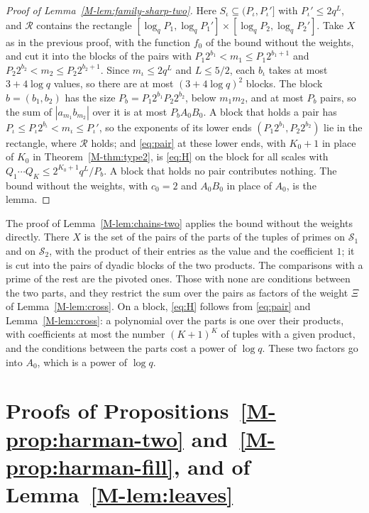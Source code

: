 \documentclass[11pt]{article}
\numberwithin{equation}{section}
\begin{document}
\begin{proof}[Proof of Lemma~\ref{M-lem:family-sharp-two}]
Here $S_\iota \subseteq (P_\iota, P_\iota']$ with $P_\iota' \le 2q^L$, and $\mathcal R$ contains the rectangle $[\log_q
P_1, \log_q P_1'] \times [\log_q P_2, \log_q P_2']$. Take $X$ as in the previous proof, with the function $f_0$ of the
bound without the weights, and cut it into the blocks
of the pairs with $P_1 2^{b_1} < m_1 \le P_1 2^{b_1 + 1}$ and $P_2 2^{b_2} < m_2 \le P_2 2^{b_2 + 1}$. Since $m_\iota
\le 2q^L$ and $L \le 5/2$, each $b_\iota$ takes at most $3 + 4 \log q$ values, so there are at most $(3 + 4 \log q)^2$
blocks. The block $b = (b_1, b_2)$ has the size $P_b = P_1 2^{b_1} P_2 2^{b_2}$, below $m_1 m_2$, and at most $P_b$
pairs, so the sum of $|a_{m_1} b_{m_2}|$ over it is at most $P_b A_0 B_0$. A block that holds a pair has $P_\iota \le
P_\iota 2^{b_\iota} < m_\iota \le P_\iota'$, so the exponents of its lower ends $(P_1 2^{b_1}, P_2 2^{b_2})$ lie in the
rectangle, where $\mathcal R$ holds; and \eqref{eq:pair} at these lower ends, with $K_0 + 1$ in place of $K_0$ in
Theorem~\ref{M-thm:type2}, is \eqref{eq:H} on the block for all scales with $Q_1 \cdots Q_K \le 2^{K_0 + 1} q^L/P_b$. A
block that holds no pair contributes nothing. The bound without the weights, with $c_0 = 2$ and $A_0 B_0$ in place of
$A_0$, is the lemma.
\end{proof}

The proof of Lemma~\ref{M-lem:chains-two} applies the bound without the weights directly. There $X$ is the set of the
pairs of the parts of the tuples of primes on $\mathcal S_1$ and on $\mathcal S_2$, with the product of their entries
as the value and the coefficient $1$; it is cut into the pairs of dyadic blocks of the two products. The comparisons
with a prime of the rest are the pivoted ones. Those with none are conditions between the two parts, and they restrict
the sum over the pairs as factors of the weight $\Xi$ of Lemma~\ref{M-lem:cross}. On a block, \eqref{eq:H} follows from
\eqref{eq:pair} and Lemma~\ref{M-lem:cross}: a polynomial over the parts is one over their products, with coefficients
at most the number $(K + 1)^K$ of tuples with a given product, and the conditions between the parts cost a power of
$\log q$. These two factors go into $A_0$, which is a power of $\log q$.

\section{Proofs of Propositions~\ref{M-prop:harman-two} and~\ref{M-prop:harman-fill}, and of
  Lemma~\ref{M-lem:leaves}}\label{app:harman}
\end{document}
